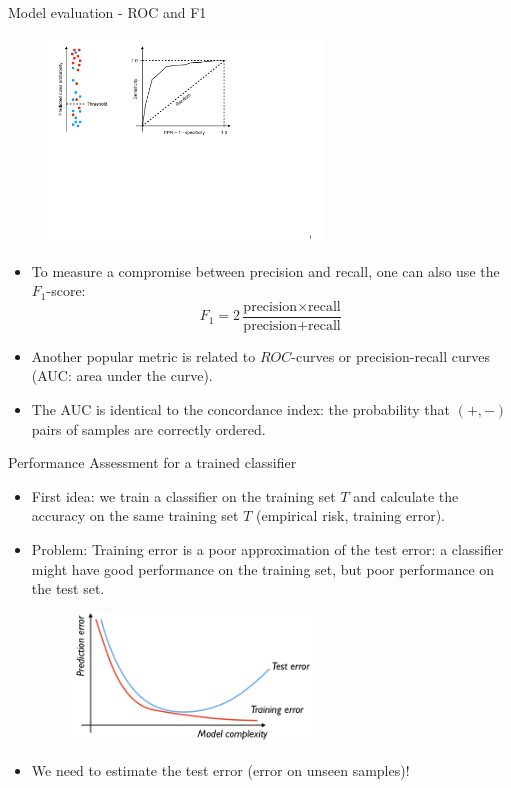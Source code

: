 \documentclass[xcolor=pdftex,dvipsnames,table]{beamer}
\begin{document}
\begin{frame}{Model evaluation - ROC and F1}
	\begin{figure}[htb]
		\includegraphics[width=0.65\textwidth]{../graphics/ROC.pdf}
	\end{figure}
	\begin{itemize}	
		\item To measure a compromise between precision and recall, one can also use the $F_1$-score:
		\begin{equation}
		F_1 = 2 \frac{\text{precision} \times \text{recall}}{\text{precision} + \text{recall}}
		\end{equation}
		\item Another popular metric is related to $ROC$-curves or precision-recall curves (AUC: area under the curve). 
		\item The AUC is identical to the concordance index: the probability that $(+,-)$ pairs of samples are correctly ordered. 
	\end{itemize}
\end{frame}



\begin{frame}{Performance Assessment for a trained classifier}
	\begin{itemize}
		\item<1-> First idea: we train a classifier on the training set $T$ and calculate the accuracy on the same training set $T$ (empirical risk, training error). 
		\item<2-> Problem: Training error is a poor approximation of the test error: a classifier might have good performance on the training set, but poor performance on the test set.
		\begin{figure}[htb]
			\includegraphics[width=0.6\textwidth]{../graphics/Training_and_test_error.png}
		\end{figure}
		\item<3-> We need to estimate the test error (error on unseen samples)!
	\end{itemize}
\end{frame}
\end{document}
